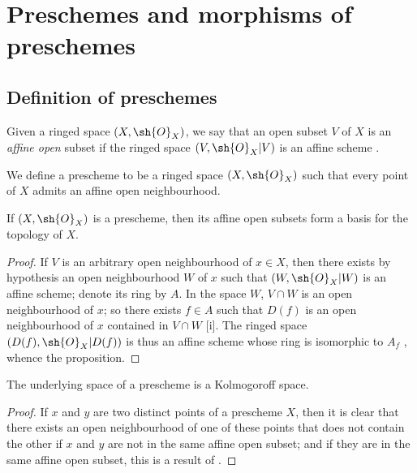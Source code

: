 \section{Preschemes and morphisms of preschemes}
\label{section:I.2}

\subsection{Definition of preschemes}
\label{subsection:I.2.1}

\begin{env}[2.1.1]
\label{I.2.1.1}
Given a ringed space $(X,\sh{O}_X)$, we say that an open subset $V$ of $X$ is an \emph{affine open} subset if the ringed space $(V,\sh{O}_X|V)$ is an affine scheme .
\end{env}

\begin{definition}[2.1.2]
\label{I.2.1.2}
We define a prescheme to be a ringed space $(X,\sh{O}_X)$ such that every point of $X$ admits an affine open neighbourhood.
\end{definition}

\begin{proposition}[2.1.3]
\label{I.2.1.3}
If $(X,\sh{O}_X)$ is a prescheme, then its affine open subsets form a basis for the topology of $X$.
\end{proposition}

\begin{proof}
If $V$ is an arbitrary open neighbourhood of $x\in X$, then there exists by hypothesis an open neighbourhood $W$ of $x$ such that $(W,\sh{O}_X|W)$ is an affine scheme;
denote its ring by $A$.
In the space $W$, $V\cap W$ is an open neighbourhood of $x$;
so there exists $f\in A$ such that $D(f)$ is an open neighbourhood of $x$ contained in $V\cap W$ [i].
The ringed space $(D(f),\sh{O}_X|D(f))$ is thus an affine scheme whose ring is isomorphic to $A_f$ , whence the proposition.
\end{proof}

\begin{proposition}[2.1.4]
\label{I.2.1.4}
The underlying space of a prescheme is a Kolmogoroff space.
\end{proposition}

\begin{proof}
If $x$ and $y$ are two distinct points of a prescheme $X$, then it is clear that there exists an open neighbourhood of one of these points that does not contain the other if $x$ and $y$ are not in the same affine open subset; and if they are in the same affine open subset, this is a result of .
\end{proof}

